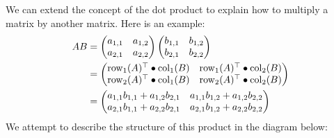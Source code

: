 \documentclass{ximera}
\begin{document}

We can extend the concept of the dot product to explain how to
multiply a matrix by another matrix. Here is an example:
\begin{align*}AB &= \begin{pmatrix}
  a_{1,1} & a_{1,2}\\
  a_{2,1} & a_{2,2}
\end{pmatrix}
                   \begin{pmatrix}
                     b_{1,1} & b_{1,2}\\
                     b_{2,1} & b_{2,2}
                   \end{pmatrix}\\
                 &= \begin{pmatrix}
                   \operatorname{row}_1(A)^\top \bullet\operatorname{col}_1(B) & \operatorname{row}_1(A)^\top\bullet\operatorname{col}_2(B)\\
                   \operatorname{row}_2(A)^\top \bullet\operatorname{col}_1(B) & \operatorname{row}_2(A)^\top\bullet\operatorname{col}_2(B)
                 \end{pmatrix}\\
                 &= \begin{pmatrix}
                   a_{1,1}b_{1,1} + a_{1,2}b_{2,1} & a_{1,1}b_{1,2}+ a_{1,2}b_{2,2}\\
                   a_{2,1}b_{1,1} + a_{2,2}b_{2,1} & a_{2,1}b_{1,2} + a_{2,2}b_{2,2}
                 \end{pmatrix}
\end{align*}
We attempt to describe the structure of this product in the diagram below:
\end{document}

